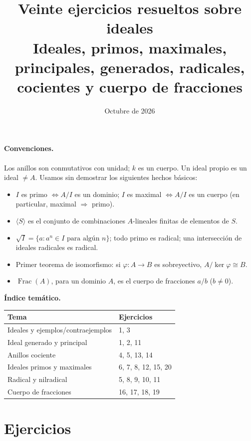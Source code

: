 \documentclass[11pt,a4paper]{article}
\title{\textbf{Veinte ejercicios resueltos sobre ideales}\\[4pt]
\large Ideales, primos, maximales, principales, generados, radicales, cocientes y cuerpo de fracciones}
\author{}
\date{Octubre de 2026}
\newcommand{\Frac}{\operatorname{Frac}}
\newcommand{\gen}[1]{\langle #1\rangle}
\theoremstyle{definition}
\newcounter{ej}
\begin{document}
\maketitle

\paragraph{Convenciones.} Los anillos son conmutativos con unidad; $k$ es un cuerpo. Un ideal propio es un ideal $\ne A$. Usamos sin demostrar los siguientes hechos básicos:
\begin{itemize}[itemsep=1pt]
\item $I$ es primo $\iff A/I$ es un dominio; $I$ es maximal $\iff A/I$ es un cuerpo (en particular, maximal $\Rightarrow$ primo).
\item $\gen S$ es el conjunto de combinaciones $A$-lineales finitas de elementos de $S$.
\item $\sqrt I=\{a: a^n\in I\text{ para algún }n\}$; todo primo es radical; una intersección de ideales radicales es radical.
\item Primer teorema de isomorfismo: si $\varphi:A\to B$ es sobreyectivo, $A/\ker\varphi\cong B$.
\item $\Frac(A)$, para un dominio $A$, es el cuerpo de fracciones $a/b$ ($b\neq0$).
\end{itemize}

\bigskip
\noindent\textbf{Índice temático.}
\begin{center}
\begin{tabular}{@{}ll@{}}
\toprule
Tema & Ejercicios \\
\midrule
Ideales y ejemplos/contraejemplos & 1, 3 \\
Ideal generado y principal & 1, 2, 11 \\
Anillos cociente & 4, 5, 13, 14 \\
Ideales primos y maximales & 6, 7, 8, 12, 15, 20 \\
Radical y nilradical & 5, 8, 9, 10, 11 \\
Cuerpo de fracciones & 16, 17, 18, 19 \\
\bottomrule
\end{tabular}
\end{center}

\section*{Ejercicios}
\end{document}

